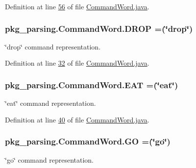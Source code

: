 Definition at line \hyperlink{CommandWord_8java_source_l00056}{56} of file \hyperlink{CommandWord_8java_source}{Command\-Word.\-java}.

\hypertarget{enumpkg__parsing_1_1CommandWord_abc97c312acca6eef77cc303d91d2d811}{
\subsubsection[{D\-R\-O\-P}]{\setlength{\rightskip}{0pt plus 5cm}pkg\-\_\-parsing.\-Command\-Word.\-D\-R\-O\-P =(\char`\"{}drop\char`\"{})}}\label{enumpkg__parsing_1_1CommandWord_abc97c312acca6eef77cc303d91d2d811}
\char`\"{}drop\char`\"{} command representation. 

Definition at line \hyperlink{CommandWord_8java_source_l00032}{32} of file \hyperlink{CommandWord_8java_source}{Command\-Word.\-java}.

\hypertarget{enumpkg__parsing_1_1CommandWord_a4fe488aea9cdd9ed9455682d42a300b3}{
\subsubsection[{E\-A\-T}]{\setlength{\rightskip}{0pt plus 5cm}pkg\-\_\-parsing.\-Command\-Word.\-E\-A\-T =(\char`\"{}eat\char`\"{})}}\label{enumpkg__parsing_1_1CommandWord_a4fe488aea9cdd9ed9455682d42a300b3}
\char`\"{}eat\char`\"{} command representation. 

Definition at line \hyperlink{CommandWord_8java_source_l00040}{40} of file \hyperlink{CommandWord_8java_source}{Command\-Word.\-java}.

\hypertarget{enumpkg__parsing_1_1CommandWord_a82b58f470d1dbcf2a9e5826632d66524}{
\subsubsection[{G\-O}]{\setlength{\rightskip}{0pt plus 5cm}pkg\-\_\-parsing.\-Command\-Word.\-G\-O =(\char`\"{}go\char`\"{})}}\label{enumpkg__parsing_1_1CommandWord_a82b58f470d1dbcf2a9e5826632d66524}
\char`\"{}go\char`\"{} command representation. 

